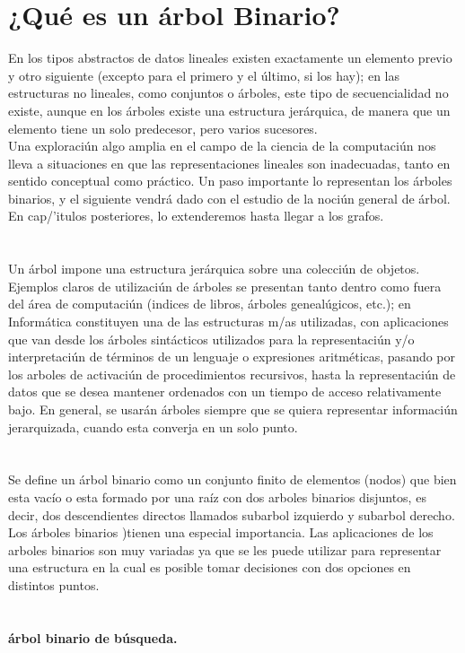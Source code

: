 \documentclass[11pt,a4paper]{report}
\begin{document}
\section{ ¿Qu\'e es un \'arbol Binario?}
En los tipos abstractos de datos lineales existen exactamente un elemento previo y otro siguiente (excepto para el primero y el \'ultimo, si los hay); en las estructuras no lineales, como conjuntos o \'arboles, este tipo de secuencialidad no existe, aunque en los \'arboles existe una estructura jer\'arquica, de manera que un elemento tiene un solo predecesor, pero varios sucesores. 
\\
Una exploraci\'un algo amplia en el campo de la ciencia de la computaci\'un nos lleva a situaciones en que las representaciones lineales son inadecuadas, tanto en sentido conceptual como pr\'actico. Un paso importante lo representan los \'arboles binarios, y el siguiente vendr\'a dado con el estudio de la noci\'un general de \'arbol. En cap/'itulos posteriores, lo extenderemos hasta llegar a los grafos.
\\
\\
\\ 
Un \'arbol impone una estructura jer\'arquica sobre una colecci\'un de objetos. Ejemplos claros de utilizaci\'un de \'arboles se presentan tanto dentro como fuera del \'area de computaci\'un (indices de libros, \'arboles geneal\'ugicos, etc.); en Inform\'atica constituyen una de las estructuras m/as utilizadas, con aplicaciones que van desde los \'arboles sint\'acticos utilizados para la representaci\'un y/o interpretaci\'un de t\'erminos de un lenguaje o expresiones aritm\'eticas, pasando por los arboles de activaci\'un de procedimientos recursivos, hasta la representaci\'un de datos que se desea mantener ordenados con un tiempo de acceso relativamente bajo. En general, se usar\'an \'arboles siempre que se quiera representar informaci\'un jerarquizada, cuando esta converja en un solo punto.
\\
\\
\\
Se define un \'arbol binario como un conjunto finito de elementos (nodos) que bien esta vac\'io o esta formado por una ra\'iz con dos arboles binarios disjuntos, es decir, dos descendientes directos llamados subarbol izquierdo y subarbol derecho.
Los \'arboles binarios )tienen una especial importancia.
Las aplicaciones de los arboles binarios son muy variadas ya que se les puede utilizar para representar una estructura en la cual es posible tomar decisiones con dos opciones en distintos puntos.
\\
\\
\\
\textbf{\'arbol binario de b\'usqueda.}
\\
\end{document}
